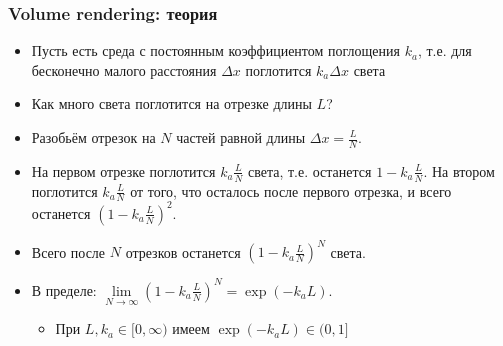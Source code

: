\documentclass{beamer}
\begin{document}
\begin{frame}[fragile]
\frametitle{Volume rendering: теория}
\begin{itemize}
\item Пусть есть среда с постоянным коэффициентом поглощения \begin{math}k_a\end{math}, т.е. для бесконечно малого расстояния \begin{math}\Delta x\end{math} поглотится \begin{math}k_a \Delta x\end{math} света
\pause
\item Как много света поглотится на отрезке длины \begin{math}L\end{math}?
\pause
\item Разобьём отрезок на \begin{math}N\end{math} частей равной длины \begin{math}\Delta x = \frac{L}{N}\end{math}.
\pause
\item На первом отрезке поглотится \begin{math}k_a \frac{L}{N}\end{math} света, т.е. останется \begin{math}1 - k_a\frac{L}{N}\end{math}. На втором поглотится \begin{math}k_a \frac{L}{N}\end{math} от того, что осталось после первого отрезка, и всего останется \begin{math}\left(1 - k_a\frac{L}{N}\right)^2\end{math}.
\pause
\item Всего после \begin{math}N\end{math} отрезков останется \begin{math}\left(1 - k_a\frac{L}{N}\right)^N\end{math} света.
\pause
\item В пределе: \begin{math}\lim\limits_{N \rightarrow \infty} \left(1 - k_a\frac{L}{N}\right)^N = \exp(- k_a L)\end{math}.
\pause
\begin{itemize}
\item При \begin{math}L, k_a \in [0, \infty)\end{math} имеем \begin{math}\exp(-k_a L) \in (0, 1]\end{math}

\end{itemize}
\end{itemize}
\end{frame}
\end{document}
